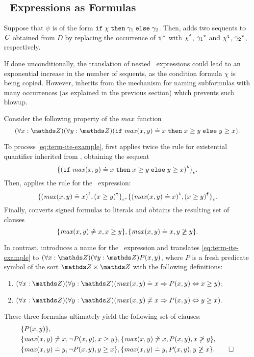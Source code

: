 \subsection*{\ITE\ Expressions as Formulas}
Suppose that $\psi$ is of the form $\mathtt{if}\;{\chi}\;\allowbreak\mathtt{then}\;{\gamma_1}\;\allowbreak\mathtt{else}\;{\gamma_2}$. 
Then, \nfcnf{} adds two sequents to $\mathit{C}$ obtained from $D$ by replacing the occurrence of ${\psi}^{\star}$ with ${\chi}^{\mathtt{f}}$, ${\gamma_1}^{\star}$ and ${\chi}^{\mathtt{t}}$, ${\gamma_2}^{\star}$, respectively.

If done unconditionally, the translation of nested \ITE\ expressions could lead to an exponential increase in the number of sequents,
as the condition formula $\chi$ is being copied. However, \nfcnf{} inherits from \newcnf{} the mechanism 
for naming subformulas with many occurrences (as explained in the previous section) which prevents such blowup.

\begin{example*} Consider the following property of the $\mathit{max}$ function
\begin{equation}\label{eq:term-ite-example}
  (\forall x:\Z)(\forall y:\Z)(\ite{\mathit{max}(x, y) \eql x}{x \geq y}{y \geq x}).
\end{equation}

To process \eqref{eq:term-ite-example}, \nfcnf{} first applies twice the rule for existential quantifier inherited from \newcnf{}, obtaining the sequent $${{\{(\mathtt{if}\;{\mathit{max}(x, y) \doteq x}\;\allowbreak\mathtt{then}\;{x \geq y}\;\allowbreak\mathtt{else}\;{y \geq x})}^{\mathtt{t}}\}}_{\epsilon}.$$ Then, \nfcnf{} applies the rule for the \ITE\ expression: $${ \{ {(\mathit{max}(x,y) \doteq x)}^{\mathtt{f}} , {(x \geq y)}^{\mathtt{t}} \} }_{\epsilon}, { \{ {(\mathit{max}(x,y) \doteq x)}^{\mathtt{t}} , {(x \geq y)}^{\mathtt{f}} \} }_{\epsilon}.$$ Finally, \nfcnf{} converts signed formulas to literals and obtains the resulting set of clauses $$\{ \mathit{max}(x,y) \not\doteq x, x \geq y \}, \{ \mathit{max}(x,y) \doteq x, y \not\geq y \}.$$

In contrast, \oldcnf{} introduces a name for the \ITE\ expression and translates \eqref{eq:term-ite-example} to $(\forall x:\Z)(\forall y:\Z)P(x,y)$, where $P$ is a fresh predicate symbol of the sort $\Z \times \Z$ with the following definitions:
\begin{enumerate}
  \item $(\forall x:\Z)(\forall y:\Z)(\mathit{max}(x, y) \eql     x \implies P(x,y) \liff x \geq y)$;
  \item $(\forall x:\Z)(\forall y:\Z)(\mathit{max}(x, y) \not\eql x \implies P(x,y) \liff y \geq x)$.
\end{enumerate}

These three formulas ultimately yield the following set of clauses:
\begin{align*}
&\{P(x,y)\},\\
&\{\mathit{max}(x, y) \not\eql x, \neg P(x,y), x \geq y\},\{\mathit{max}(x, y) \not\eql x, P(x,y), x \not\geq y\},\\
&\{\mathit{max}(x, y) \eql y, \neg P(x,y), y \geq x\},\{\mathit{max}(x, y) \eql y, P(x,y), y \not\geq x\}.\QED
\end{align*}
\end{example*}

